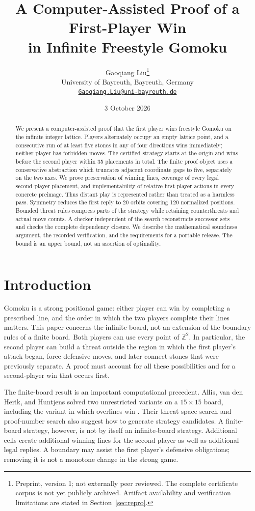 \documentclass[11pt]{article}
\title{A Computer-Assisted Proof of a First-Player Win\\in Infinite Freestyle Gomoku}
\author{Gaoqiang Liu\thanks{Preprint, version 1; not externally peer reviewed. The complete certificate corpus is not yet publicly archived. Artifact availability and verification limitations are stated in Section~\ref{sec:repro}.}\\University of Bayreuth, Bayreuth, Germany\\\href{mailto:Gaoqiang.Liu@uni-bayreuth.de}{\texttt{Gaoqiang.Liu@uni-bayreuth.de}}}
\date{3 October 2026}
\theoremstyle{definition}
\theoremstyle{remark}
\newcommand{\Z}{\mathbb Z}
\begin{document}
\maketitle
\begin{abstract}
We present a computer-assisted proof that the first player wins freestyle
Gomoku on the infinite integer lattice. Players alternately occupy an empty
lattice point, and a consecutive run of at least five stones in any of four
directions wins immediately; neither player has forbidden moves. The
certified strategy starts at the origin and wins before the second player
within 35 placements in total. The finite proof object uses a conservative
abstraction which truncates adjacent coordinate gaps to five, separately on
the two axes. We prove preservation of winning lines, coverage of every legal
second-player placement, and implementability of relative first-player
actions in every concrete preimage. Thus distant play is represented rather
than treated as a harmless pass. Symmetry reduces the first reply to 20
orbits covering 120 normalized positions. Bounded threat rules compress parts
of the strategy while retaining counterthreats and actual move counts. A
checker independent of the search reconstructs successor sets and checks the
complete dependency closure. We describe the mathematical soundness argument,
the recorded verification, and the requirements for a portable release. The
bound is an upper bound, not an assertion of optimality.
\end{abstract}

\section{Introduction}
\label{sec:intro}
Gomoku is a strong positional game: either player can win by completing a
prescribed line, and the order in which the two players complete their lines
matters. This paper concerns the infinite board, not an extension of the
boundary rules of a finite board. Both players can use every point of $\Z^2$.
In particular, the second player can build a threat outside the region in
which the first player's attack began, force defensive moves, and later
connect stones that were previously separate. A proof must account for all
these possibilities and for a second-player win that occurs first.

The finite-board result is an important computational precedent. Allis,
van den Herik, and Huntjens solved two unrestricted variants on a $15\times15$
board, including the variant in which overlines win
\cite{Allis1993,Allis1996}. Their threat-space search and proof-number search
also suggest how to generate strategy candidates. A finite-board strategy,
however, is not by itself an infinite-board strategy. Additional cells create
additional winning lines for the second player as well as additional legal
replies. A boundary may assist the first player's defensive obligations;
removing it is not a monotone change in the strong game.
\end{document}
